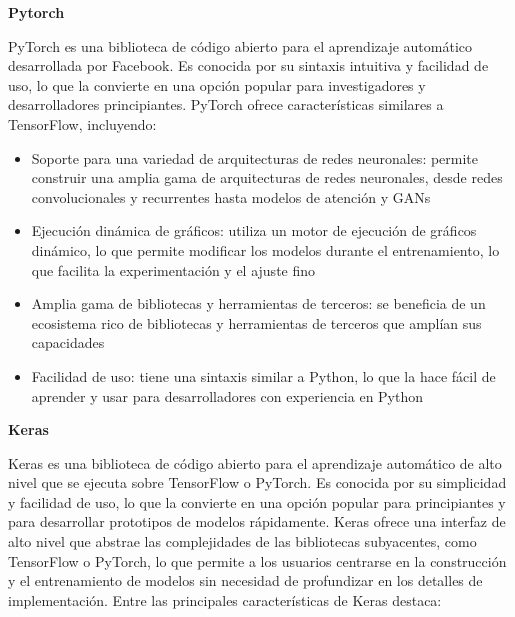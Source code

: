\documentclass[
  a4paper,
  DIV=11,
  numbers=noendperiod]{scrreprt}
\providecommand{\tightlist}{%
  \setlength{\itemsep}{0pt}\setlength{\parskip}{0pt}}\usepackage{longtable,booktabs,array}
\begin{document}
\textbf{Pytorch}

PyTorch es una biblioteca de código abierto para el aprendizaje
automático desarrollada por Facebook. Es conocida por su sintaxis
intuitiva y facilidad de uso, lo que la convierte en una opción popular
para investigadores y desarrolladores principiantes. PyTorch ofrece
características similares a TensorFlow, incluyendo:

\begin{itemize}
\tightlist
\item
  Soporte para una variedad de arquitecturas de redes neuronales:
  permite construir una amplia gama de arquitecturas de redes
  neuronales, desde redes convolucionales y recurrentes hasta modelos de
  atención y GANs
\item
  Ejecución dinámica de gráficos: utiliza un motor de ejecución de
  gráficos dinámico, lo que permite modificar los modelos durante el
  entrenamiento, lo que facilita la experimentación y el ajuste fino
\item
  Amplia gama de bibliotecas y herramientas de terceros: se beneficia de
  un ecosistema rico de bibliotecas y herramientas de terceros que
  amplían sus capacidades
\item
  Facilidad de uso: tiene una sintaxis similar a Python, lo que la hace
  fácil de aprender y usar para desarrolladores con experiencia en
  Python
\end{itemize}

\textbf{Keras}

Keras es una biblioteca de código abierto para el aprendizaje automático
de alto nivel que se ejecuta sobre TensorFlow o PyTorch. Es conocida por
su simplicidad y facilidad de uso, lo que la convierte en una opción
popular para principiantes y para desarrollar prototipos de modelos
rápidamente. Keras ofrece una interfaz de alto nivel que abstrae las
complejidades de las bibliotecas subyacentes, como TensorFlow o PyTorch,
lo que permite a los usuarios centrarse en la construcción y el
entrenamiento de modelos sin necesidad de profundizar en los detalles de
implementación. Entre las principales características de Keras destaca:
\end{document}
